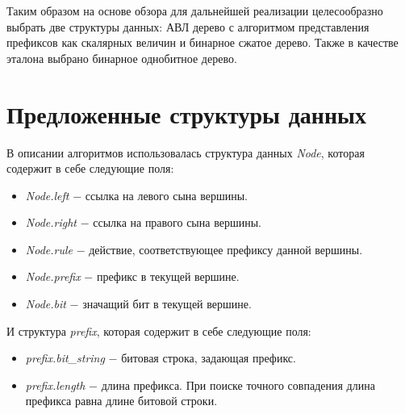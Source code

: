 \documentclass[conference]{IEEEtran}
\begin{document}
        Таким образом на основе обзора для дальнейшей реализации целесообразно выбрать две структуры данных: 
        АВЛ дерево с алгоритмом представления префиксов как скалярных величин и бинарное сжатое дерево. 
        Также в качестве эталона выбрано бинарное однобитное дерево.

\section{Предложенные структуры данных}
        \label{section:trees}
        В описании алгоритмов использовалась структура данных \emph{Node}, которая содержит в себе следующие поля:
        \begin{itemize}
            \item \emph{Node.left} $-$ ссылка на левого сына вершины.
            \item \emph{Node.right} $-$ ссылка на правого сына вершины.
            \item \emph{Node.rule} $-$ действие, соответствующее префиксу данной вершины.
            \item \emph{Node.prefix} $-$ префикс в текущей вершине.
            \item \emph{Node.bit} $-$ значащий бит в текущей вершине.
        \end{itemize}
        И структура \emph{prefix}, которая содержит в себе следующие поля:
        \begin{itemize}
            \item \emph{prefix.bit\_string} $-$ битовая строка, задающая префикс.
            \item \emph{prefix.length} $-$ длина префикса. При поиске точного совпадения длина префикса равна длине битовой строки.
        \end{itemize}
\end{document}
